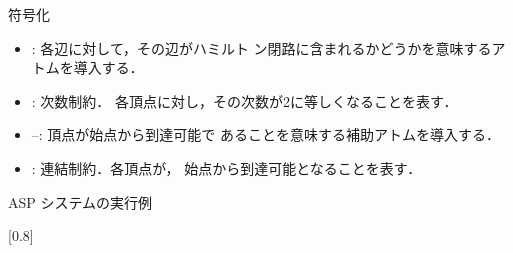 \documentclass[dvipdfmx]{beamer}
\begin{document}
\begin{frame}[shrink]{ 符号化}

\begin{exampleblock}{}

\end{exampleblock}

\begin{itemize}
\item {}: 各辺に対して，その辺がハミルト
      ン閉路に含まれるかどうかを意味するアトムを導入する．
\item {}: 次数制約．
      各頂点に対し，その次数が2に等しくなることを表す．
\item {}--: 頂点が始点から到達可能で
  あることを意味する補助アトムを導入する．
\item {}: 連結制約．各頂点が，
  始点から到達可能となることを表す．
\end{itemize}
\end{frame}
\begin{frame}[shrink]{ASP システム{\clingo}の実行例}
\begin{center}
\scalebox{0.8}[0.8]{}
\end{center}

\begin{exampleblock}{}

\end{exampleblock}

\end{frame}
\end{document}
